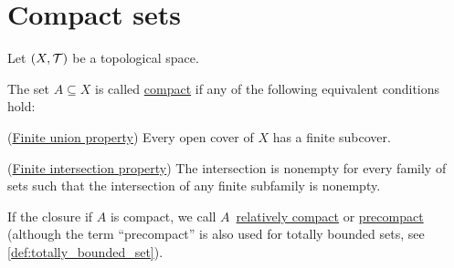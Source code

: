 \section{Compact sets}\label{sec:compact_sets}

Let $(X, \mathcal T)$ be a topological space.

\begin{definition}\label{def:compact_set}\cite[40]{Deimling1985}
  The set $A \subseteq X$ is called \uline{compact} if any of the following equivalent conditions hold:
  \begin{defenum}
    \item\label{def:compact_set/union} (\uline{Finite union property}) Every open cover of $X$ has a finite subcover.
    \item\label{def:compact_set/intersection} (\uline{Finite intersection property}) The intersection is nonempty for every family of sets such that the intersection of any finite subfamily is nonempty.
  \end{defenum}

  If the closure if $A$ is compact, we call $A$~\uline{relatively compact} or \uline{precompact} (although the term \enquote{precompact} is also used for totally bounded sets, see \ref{def:totally_bounded_set}).
\end{definition}
